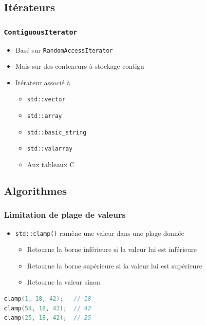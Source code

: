 \documentclass[C++.tex]{subfiles}
\begin{document}
\subsection*{Itérateurs}
\begin{frame}
	\frametitle{\lstinline|ContiguousIterator|}
	\begin{itemize}
		\item Basé sur \lstinline|RandomAccessIterator|
		\item Mais sur des conteneurs \og à stockage contigu\fg{}
		\item Itérateur associé à 
		\begin{itemize}
			\item \lstinline|std::vector|
			\item \lstinline|std::array|
			\item \lstinline|std::basic_string|
			\item \lstinline|std::valarray|
			\item Aux tableaux C
		\end{itemize}
	\end{itemize}

\end{frame}

\subsection*{Algorithmes}
\begin{frame}[fragile]
	\frametitle{Limitation de plage de valeurs}
	\begin{itemize}
		\item \lstinline|std::clamp()| ramène une valeur dans une plage donnée
		\begin{itemize}
			\item Retourne la borne inférieure si la valeur lui est inférieure
			\item Retourne la borne supérieure si la valeur lui est supérieure
			\item Retourne la valeur sinon
		\end{itemize}
	\end{itemize}

	\begin{lstlisting}[language=C++]
clamp(1, 18, 42);   // 18
clamp(54, 18, 42);  // 42
clamp(25, 18, 42);  // 25\end{lstlisting}
\end{frame}
\end{document}
